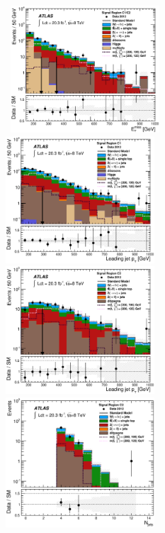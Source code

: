 \begin{figure}[!ht]
  \begin{center}
    \mbox{
      \includegraphics[width=0.495\textwidth]{Appendix_CharmTagged/Figures/can_SR_C1NoMet_met_final.eps}
      \includegraphics[width=0.495\textwidth]{Appendix_CharmTagged/Figures/can_SR_C1NoJetPt_jet1Pt_final.eps}
    }
    \mbox{
      \includegraphics[width=0.495\textwidth]{Appendix_CharmTagged/Figures/can_SR_C2NoJetPt_jet1Pt_final.eps}
      \includegraphics[width=0.495\textwidth]{Appendix_CharmTagged/Figures/can_VR_SRC2_nJet30_final.eps}
}
\end{center}
\end{figure}
